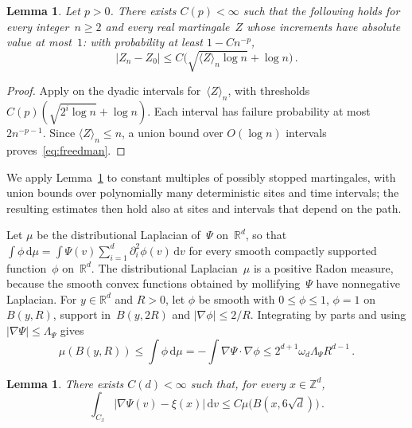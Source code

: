 \documentclass[11pt]{amsart}
\theoremstyle{plain}
\newtheorem{lemma}[theorem]{Lemma}
\theoremstyle{definition}
\newcommand{\Z}{\mathbb Z}
\newcommand{\R}{\mathbb R}
\newcommand{\gauge}{\Psi}
\newcommand{\dd}{\,\mathrm d}
\numberwithin{equation}{section}
\begin{document}
\begin{lemma}\label{lem:freedman}
Let $p>0$. There exists $C(p)<\infty$ such that the following holds for every integer~$n\geq2$ and every real martingale~$Z$ whose increments have absolute value at most~$1$: with probability at least $1-Cn^{-p}$,
\begin{equation}\label{eq:freedman}
|Z_n-Z_0|\leq C\bigl(\sqrt{\langle Z\rangle_n\log n}+\log n\bigr)\, .
\end{equation}
\end{lemma}

\begin{proof}
Apply \citet*[Theorem~1.6]{Freedman1975} on the dyadic intervals for~$\langle Z\rangle_n$, with thresholds $C(p)(\sqrt{2^i\log n}+\log n)$. Each interval has failure probability at most $2n^{-p-1}$. Since $\langle Z\rangle_n\leq n$, a union bound over $O(\log n)$ intervals proves~\eqref{eq:freedman}.
\end{proof}

We apply Lemma~\ref{lem:freedman} to constant multiples of possibly stopped martingales, with union bounds over polynomially many deterministic sites and time intervals; the resulting estimates then hold also at sites and intervals that depend on the path.

Let $\mu$ be the distributional Laplacian of~$\gauge$ on~$\R^d$, so that $\int\phi\dd\mu=\int \gauge(v)\sum_{i=1}^d\partial_i^2\phi(v)\dd v$ for every smooth compactly supported function~$\phi$ on~$\R^d$. The distributional Laplacian~$\mu$ is a positive Radon measure, because the smooth convex functions obtained by mollifying~$\gauge$ have nonnegative Laplacian. For $y\in\R^d$ and $R>0$, let $\phi$ be smooth with $0\leq\phi\leq1$, $\phi=1$ on~$B(y,R)$, support in~$B(y,2R)$ and $|\nabla\phi|\leq2/R$. Integrating by parts and using $|\nabla \gauge|\leq\Lambda_\gauge$ gives
\begin{equation}\label{eq:hessian-growth}
\mu(B(y,R))\leq\int\phi\dd\mu=-\int\nabla \gauge\cdot\nabla\phi\leq2^{d+1}\omega_d\Lambda_\gauge R^{d-1}\, .
\end{equation}

\begin{lemma}\label{lem:cell}
There exists $C(d)<\infty$ such that, for every $x\in\Z^d$,
\begin{equation*}
\int_{C_x}|\nabla \gauge(v)-\xi(x)|\dd v\leq C\mu\bigl(B(x,6\sqrt d)\bigr)\, .
\end{equation*}
\end{lemma}
\end{document}
